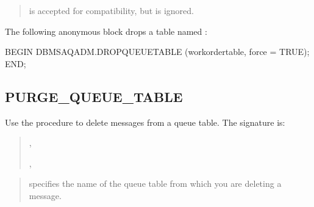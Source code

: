\documentclass[letterpaper,10pt,english,openany,oneside]{sphinxmanual}
\begin{document}
\begin{quote}

 is accepted for compatibility, but is ignored.
\end{quote}


The following anonymous block drops a table named :

%
\begin{sphinxVerbatim}[commandchars=\\\{\}]
BEGIN
  DBMS\PYGZus{}AQADM.DROP\PYGZus{}QUEUE\PYGZus{}TABLE (\PYGZsq{}work\PYGZus{}order\PYGZus{}table\PYGZsq{}, force =\PYGZgt{} TRUE);
END;
\end{sphinxVerbatim}

\newpage


\subsection{PURGE\_QUEUE\_TABLE}
\label{\detokenize{purge_queue_table::doc}}\label{\detokenize{purge_queue_table:purge-queue-table}}
Use the  procedure to delete messages from a queue
table. The signature is:
\begin{quote}

\begin{DUlineblock}{0em}
\item[] 
\item[]
\begin{DUlineblock}{\DUlineblockindent}
\item[] ,
\item[] ,
\item[] 
\end{DUlineblock}
\end{DUlineblock}
\end{quote}


\begin{quote}

 specifies the name of the queue table from which you
are deleting a message.
\end{quote}
\end{document}
